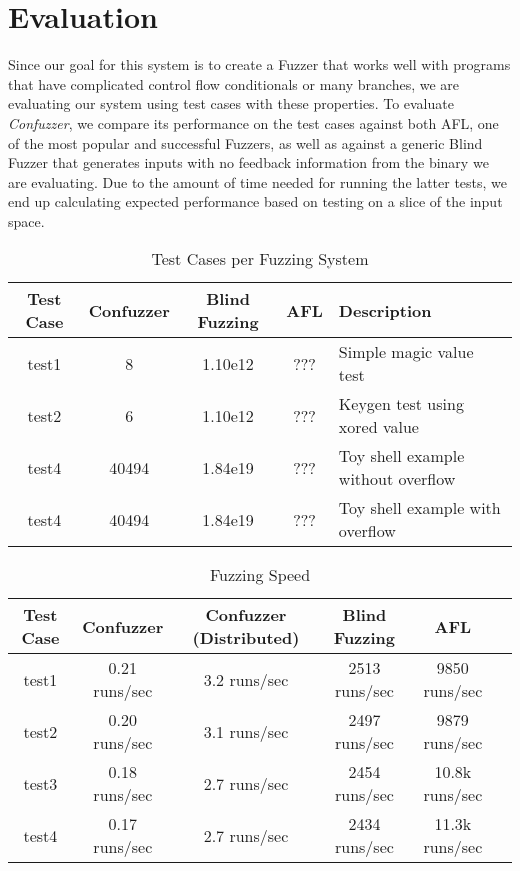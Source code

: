 \chapter{Evaluation}
Since our goal for this system is to create a Fuzzer that works well with
programs that have complicated control flow conditionals or many branches, we
are evaluating our system using test cases with these properties. To evaluate
\textit{Confuzzer}, we compare its performance on the test cases against both
AFL, one of the most popular and successful Fuzzers, as well as against a
generic Blind Fuzzer that generates inputs with no feedback information from the
binary we are evaluating. Due to the amount of time needed for running the
latter tests, we end up calculating expected performance based on testing on a
slice of the input space.

\begin{table}
\begin{center}
\begin{tabular}{| c | c | c | c | p{6cm} |}
\hline
Test Case & Confuzzer & Blind Fuzzing & AFL & Description\\\hline
test1 & 8 & 1.10e12 & ??? & Simple magic value test\\\hline
test2 & 6 & 1.10e12 & ??? & Keygen test using xored value\\\hline
test4 & 40494 & 1.84e19 & ??? & Toy shell example without overflow\\\hline
test4 & 40494 & 1.84e19 & ??? & Toy shell example with overflow\\\hline
\end{tabular}
\end{center}
\caption{Test Cases per Fuzzing System}
\label{table:evalcases}
\end{table}

\begin{table}
\begin{center}
\begin{tabular}{| c | c | c | c | c | p{6cm} |}
\hline
Test Case & Confuzzer & Confuzzer (Distributed) & Blind Fuzzing & AFL\\\hline
test1 & 0.21 runs/sec & 3.2 runs/sec & 2513 runs/sec & 9850 runs/sec\\\hline
test2 & 0.20 runs/sec & 3.1 runs/sec & 2497 runs/sec & 9879 runs/sec\\\hline
test3 & 0.18 runs/sec & 2.7 runs/sec & 2454 runs/sec & 10.8k runs/sec\\\hline
test4 & 0.17 runs/sec & 2.7 runs/sec & 2434 runs/sec & 11.3k runs/sec\\\hline
\end{tabular}
\end{center}
\caption{Fuzzing Speed}
\label{table:evaltime}
\end{table}

